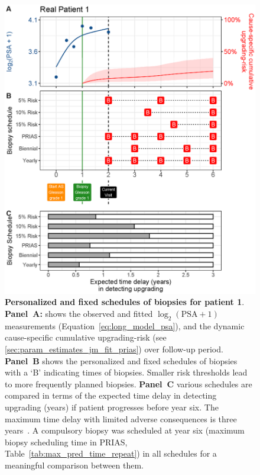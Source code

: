 \begin{figure}
\centerline{\includegraphics[width=\columnwidth]{images/demo_pat1_supp.eps}}
\caption{\textbf{Personalized and fixed schedules of biopsies for patient 1}. \textbf{Panel~A:} shows the observed and fitted $\log_2(\mbox{PSA} + 1)$ measurements (Equation~\ref{eq:long_model_psa}), and the dynamic cause-specific cumulative upgrading-risk (see \ref{sec:param_estimates_jm_fit_prias}) over follow-up period. \textbf{Panel~B} shows the personalized and fixed schedules of biopsies with a `B' indicating times of biopsies. Smaller risk thresholds lead to more frequently planned biopsies. \textbf{Panel~C} various schedules are compared in terms of the expected time delay in detecting upgrading (years) if patient progresses before year six. The maximum time delay with limited adverse consequences is three years~\citep{de2017estimating}. A compulsory biopsy was scheduled at year six (maximum biopsy scheduling time in PRIAS, Table~\ref{tab:max_pred_time_repeat}) in all schedules for a meaningful comparison between them.}
\label{fig:demo_pat1_supp}
\end{figure}

